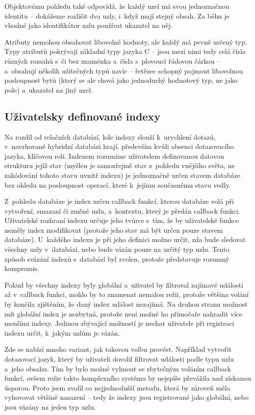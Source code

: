 Objektovému pohledu také odpovídá, že každý uzel má svou jednoznačnou identitu
-- dokážeme rozlišit dva uzly, i~když mají stejný obsah. Za běhu je vhodné jako
identifikátor uzlu používat ukazatel na něj.

Atributy nemohou obsahovat libovolné hodnoty, ale každý má pevně určený typ. Typy
atributů pokrývají základní typy jazyka C -- jsou mezi nimi tedy celá čísla
různých rozsahů s~či bez znaménka a~čísla s~plovoucí řádovou čárkou -- a~obsahují
několik užitečných typů navíc -- řetězec schopný pojmout libovolnou posloupnost
bytů (který se ale chová jako jednoduchý hodnotový typ, ne jako pole) a~ukazatel na jiný
uzel.

\subsection{Uživatelsky definované indexy}
Na rozdíl od relačních databází, kde indexy slouží  k~urychlení
dotazů, v~navrhované hybridní databázi hrají, především kvůli absenci
dotazovacího jazyka, klíčovou roli. Indexem rozumíme uživatelem definovanou
datovou strukturu jejíž stav (myšlen je samozřejmě stav z~pohledu vnějšího
světa, ne zakódování tohoto stavu uvnitř indexu) je jednoznačně určen stavem
databáze bez ohledu
na posloupnost operací, které k~jejímu současnému stavu vedly.

Z~pohledu databáze je index určen callback funkcí, kterou databáze volá při
vytvoření, smazaní či změně uzlu, a~kontextu, který je předán callback funkci.
Uživatelské rozhraní indexu určuje jeho tvůrce
s~tím, že by uživatelské
funkce neměly index modifikovat (protože jeho stav má být určen pouze stavem
databáze). U~každého indexu je při jeho definici možno určit, zda bude
sledovat všechny uzly v~databázi, nebo bude vázán pouze na určitý typ uzlu.
Tento způsob svázání indexů s~databází byl zvolen, protože představuje rozumný
kompromis.

Pokud by všechny indexy byly globální a~uživatel by filtroval zajímavé
události až v~callback funkci, mohlo by to znamenat nemalou režii, protože
většina volání by končila zjištěním, že daný index událost nezajímá.
Na druhou stranu
možnost mít globální index je nezbytná, protože není možné ho přímočaře nahradit
více menšími indexy. Jedinou zbývající možností je nechat uživatele při registraci
indexu určit, k~jakým uzlům je vázán. 

Zde se nabízí mnoho variant, jak takovou volbu
provést. Například vytvořit dotazovací jazyk, který by uživateli dovolil filtrovat
události podle typu uzlu a~jeho obsahu. 
Tím by bylo možné vyhnout se zbytečným voláním callback funkcí, ovšem režie
takto komplexního systému by nejspíše převážila nad získanou úsporou.
Proto jsem zvolil co nejjednodušší metodu, která by zároveň měla vyhovovat většině
nasazení -- tedy že indexy jsou registrované jako globální, nebo jsou vázány na
jeden typ uzlu.

